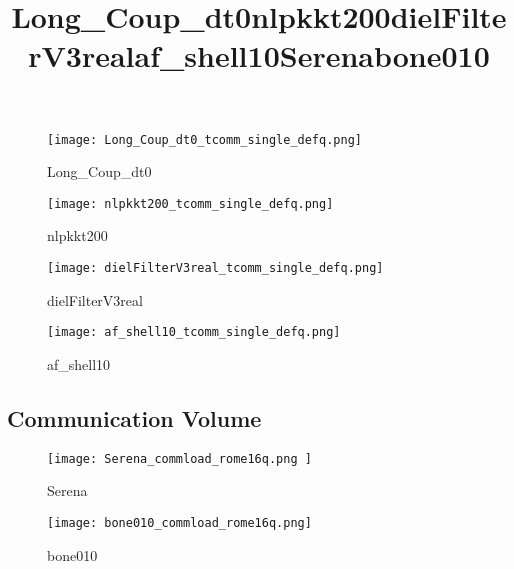\begin{figure}[H]
    \title{Long\_Coup\_dt0}
    \begin{center}
        \texttt{[image: Long\_Coup\_dt0\_tcomm\_single\_defq.png]}
    \end{center}
    \caption{Long\_Coup\_dt0}
    \label{fig:Long_Coup_dt0_tcomm_single_defq.png}
\end{figure}

\begin{figure}[H]
    \title{nlpkkt200}
    \begin{center}
        \texttt{[image: nlpkkt200\_tcomm\_single\_defq.png]}
    \end{center}
    \caption{nlpkkt200}
    \label{fig:nlpkkt200_defq_tcomm_single.png}
\end{figure}

\begin{figure}[H]
    \title{dielFilterV3real}
    \begin{center}
        \texttt{[image: dielFilterV3real\_tcomm\_single\_defq.png]}
    \end{center}
    \caption{dielFilterV3real}
    \label{fig:dielFilterV3real_tcomm_single_defq.png}
\end{figure}

\begin{figure}[H]
    \title{af\_shell10}
    \begin{center}
        \texttt{[image: af\_shell10\_tcomm\_single\_defq.png]}
    \end{center}
    \caption{af\_shell10}
    \label{fig:af_shell10_defq_tcomm_single.png}
\end{figure}


\subsection{Communication Volume \romeq}


\begin{figure}[H]
    \title{Serena}
    \begin{center}
        \texttt{[image: Serena\_commload\_rome16q.png ]}
    \end{center}
    \caption{Serena}
    \label{fig:Serena_commload_rome16q.png}
\end{figure}

\begin{figure}[H]
    \title{bone010}
    \begin{center}
        \texttt{[image: bone010\_commload\_rome16q.png]}
    \end{center}
    \caption{bone010}
    \label{fig:bone010_commload_rome16q.png}
\end{figure}

